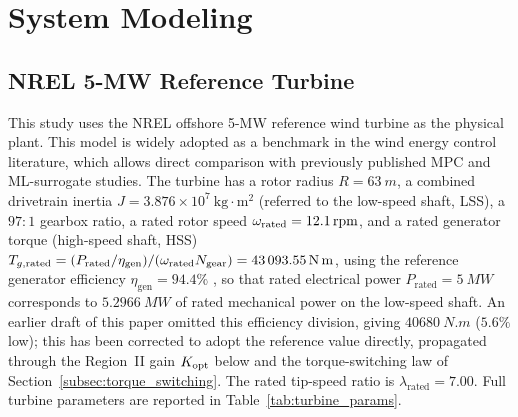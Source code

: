 
\section{System Modeling}
\label{sec:system_modeling}

\subsection{NREL 5-MW Reference Turbine}
\label{subsec:nrel5mw}

This study uses the NREL offshore 5-MW reference wind turbine
\citep{jonkman2009} as the physical plant. This model is widely adopted as a
benchmark in the wind energy control literature, which allows direct
comparison with previously published MPC and ML-surrogate studies. The
turbine has a rotor radius $R = \SI{63}{m}$, a combined drivetrain inertia
$J = 3.876 \times 10^{7}~\text{kg}\cdot\text{m}^2$ (referred to the
low-speed shaft, LSS), a $97{:}1$ gearbox ratio, a rated rotor speed
$\omega_{\text{rated}} = \SI{12.1}{rpm}$, and a rated generator torque (high-speed
shaft, HSS) $T_{g,\text{rated}} = (P_{\text{rated}}/\eta_{\text{gen}}) /
(\omega_{\text{rated}} N_{\text{gear}}) = \SI{43093.55}{N.m}$, using the
reference generator efficiency $\eta_{\text{gen}}=94.4\%$
\citep{jonkman2009}, so that rated electrical power
$P_{\text{rated}}=\SI{5}{MW}$ corresponds to $\SI{5.2966}{MW}$ of
rated mechanical power on the low-speed shaft. An earlier draft of
this paper omitted this efficiency division, giving
$\SI{40680}{N.m}$ ($5.6\%$ low); this has been corrected to adopt the
reference value directly, propagated through the Region~II gain
$K_{\text{opt}}$ below and the torque-switching law of
Section~\ref{subsec:torque_switching}. The rated tip-speed ratio is
$\lambda_{\text{rated}} = 7.00$. Full turbine parameters are reported in
Table~\ref{tab:turbine_params}.

